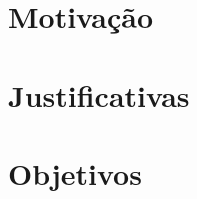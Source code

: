 \section{Motivação}\label{sec:Motivacao}


\section{Justificativas}\label{sec:Justificativas}


\section{Objetivos}\label{sec:Objetivos}
